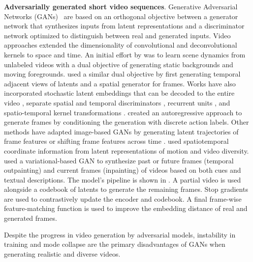 \noindent
\textbf{Adversarially generated short video sequences}. Generative Adversarial Networks (GANs)~ are based on an orthogonal objective between a generator network that synthesizes inputs from latent representations and a discriminator network optimized to distinguish between real and generated inputs. Video approaches extended the dimensionality of convolutional and deconvolutional kernels to space and time. An initial effort by  was to learn scene dynamics from unlabeled videos with a dual objective of generating static backgrounds and moving foregrounds.  used a similar dual objective by first generating temporal adjacent views of latents and a spatial generator for frames. Works have also incorporated stochastic latent embeddings that can be decoded to the entire video , separate spatial and temporal discriminators , recurrent units , and spatio-temporal kernel transformations .  created an autoregressive approach to generate frames by conditioning the generation with discrete action labels. Other methods have adapted image-based GANs by generating latent trajectories of frame features  or shifting frame features across time .  used spatiotemporal coordinate information from latent representations of motion and video diversity.  used a variational-based GAN  to synthesize past or future frames (temporal outpainting) and current frames (inpainting) of videos based on both cues and textual descriptions. The model's pipeline is shown in . A partial video is used alongside a codebook of latents to generate the remaining frames. Stop gradients are used to contrastively update the encoder and codebook. A final frame-wise feature-matching function is used to improve the embedding distance of real and generated frames. 


Despite the progress in video generation by adversarial models, instability in training and mode collapse are the primary disadvantages of GANs when generating realistic and diverse videos. 


